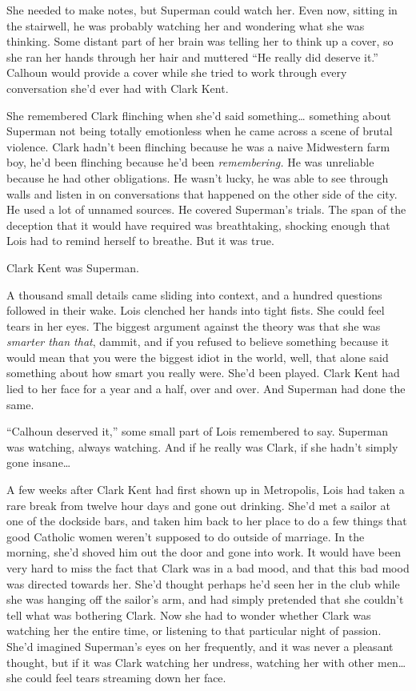 She needed to make notes, but Superman could watch her. Even now,
sitting in the stairwell, he was probably watching her and wondering
what she was thinking. Some distant part of her brain was telling her to
think up a cover, so she ran her hands through her hair and muttered
``He really did deserve it.'' Calhoun would provide a cover while she
tried to work through every conversation she'd ever had with Clark Kent.

She remembered Clark flinching when she'd said something\ldots{}
something about Superman not being totally emotionless when he came
across a scene of brutal violence. Clark hadn't been flinching because
he was a naive Midwestern farm boy, he'd been flinching because he'd
been \emph{remembering.} He was unreliable because he had other
obligations. He wasn't lucky, he was able to see through walls and
listen in on conversations that happened on the other side of the city.
He used a lot of unnamed sources. He covered Superman's trials. The span
of the deception that it would have required was breathtaking, shocking
enough that Lois had to remind herself to breathe. But it was true.

Clark Kent was Superman.

A thousand small details came sliding into context, and a hundred
questions followed in their wake. Lois clenched her hands into tight
fists. She could feel tears in her eyes. The biggest argument against
the theory was that she was \emph{smarter than that}, dammit, and if you
refused to believe something because it would mean that you were the
biggest idiot in the world, well, that alone said something about how
smart you really were. She'd been played. Clark Kent had lied to her
face for a year and a half, over and over. And Superman had done the
same.

``Calhoun deserved it,'' some small part of Lois remembered to say.
Superman was watching, always watching. And if he really was Clark, if
she hadn't simply gone insane\ldots{}

A few weeks after Clark Kent had first shown up in Metropolis, Lois had
taken a rare break from twelve hour days and gone out drinking. She'd
met a sailor at one of the dockside bars, and taken him back to her
place to do a few things that good Catholic women weren't supposed to do
outside of marriage. In the morning, she'd shoved him out the door and
gone into work. It would have been very hard to miss the fact that Clark
was in a bad mood, and that this bad mood was directed towards her.
She'd thought perhaps he'd seen her in the club while she was hanging
off the sailor's arm, and had simply pretended that she couldn't tell
what was bothering Clark. Now she had to wonder whether Clark was
watching her the entire time, or listening to that particular night of
passion. She'd imagined Superman's eyes on her frequently, and it was
never a pleasant thought, but if it was Clark watching her undress,
watching her with other men\ldots{} she could feel tears streaming down
her face.

